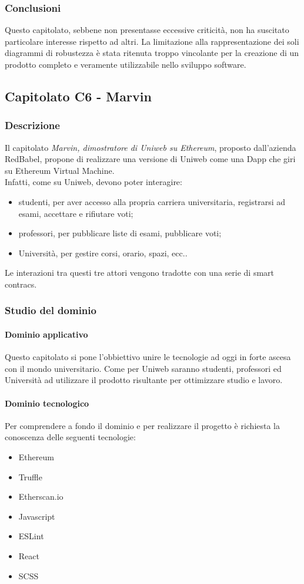		\subsubsection{Conclusioni}
		Questo capitolato, sebbene non presentasse eccessive criticità, non ha suscitato particolare interesse rispetto ad altri. La limitazione alla rappresentazione dei soli diagrammi di robustezza è stata ritenuta troppo vincolante per la creazione di un prodotto completo e veramente utilizzabile nello sviluppo software.
		
		
	\subsection{Capitolato C6 - Marvin}
		\subsubsection{Descrizione}
		Il capitolato \emph{Marvin, dimostratore di Uniweb su Ethereum}, proposto dall'azienda RedBabel, propone di realizzare una versione di Uniweb come una Dapp che giri su Ethereum Virtual Machine. \\  Infatti, come su Uniweb, devono poter interagire:
		\begin{itemize} 
			\item studenti, per aver accesso alla propria carriera universitaria, registrarsi ad esami, accettare e rifiutare voti; 
			\item professori, per pubblicare liste di esami, pubblicare voti;
			\item Università, per gestire corsi, orario, spazi, ecc..
		\end{itemize}
	 	Le interazioni tra questi tre attori vengono tradotte con una serie di smart contracs.
		\subsubsection{Studio del dominio}
			\paragraph{Dominio applicativo} \Spazio
			Questo capitolato si pone l'obbiettivo unire le tecnologie ad oggi in forte ascesa con il mondo universitario. Come per Uniweb saranno studenti, professori ed Università ad utilizzare il prodotto risultante per ottimizzare studio e lavoro.
			\paragraph{Dominio tecnologico} \Spazio
			Per comprendere a fondo il dominio e per realizzare il progetto è richiesta la conoscenza delle seguenti tecnologie:
			\begin{itemize}
				\item Ethereum
				\item Truffle
				\item Etherscan.io
				\item Javascript
				\item ESLint
				\item React
				\item SCSS
			\end{itemize}
